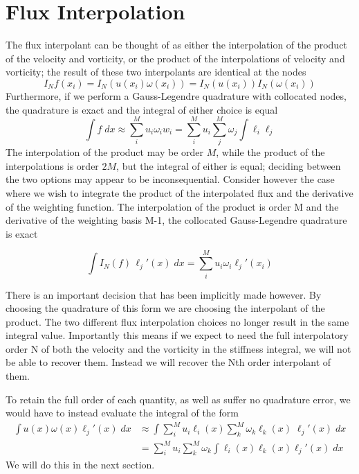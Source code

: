 \documentclass[letterpaper,12pt]{report}
\newcommand{\be}{\begin{equation}}
\newcommand{\ee}{\end{equation}}
\begin{document}
\section{Flux Interpolation}
The flux interpolant can be thought of  as either the interpolation of the product of the velocity and vorticity, or the product of the interpolations of velocity and vorticity; the result of these two interpolants are identical at the nodes
\be I_N f(x_i) = I_N(u(x_i) \omega(x_i)) = I_N(u(x_i)) I_N(\omega(x_i)) \ee
Furthermore, if we perform a Gauss-Legendre quadrature with collocated nodes, the quadrature is exact and the integral of either choice is equal
\be \int f \;dx \approx \sum_i^M u_i \omega_i w_i = \sum_i^M u_i \sum_j^M \omega_j \int \ell_i \ell_j \ee
The interpolation of the product may be order $M$, while the product of the interpolations is order $2M$, but the integral of either is equal; deciding between the two options may appear to be inconsequential. Consider however the case where we wish to integrate the product of the interpolated flux and the derivative of the weighting function. The interpolation of the product is order M and the derivative of the weighting basis M-1, the collocated Gauss-Legendre quadrature is exact

\be \int I_N(f) \, \ell_j'(x) \;dx = \sum_i^M u_i\omega_i \ell_j'(x_i) \ee

There is an important decision that has been implicitly made however. By choosing the quadrature of this form we are choosing the interpolant of the product. The two different flux interpolation choices no longer result in the same integral value. Importantly this means if we expect to need the full interpolatory order N of both the velocity and the vorticity in the stiffness integral, we will not be able to recover them. Instead we will recover the Nth order interpolant of them.

To retain the full order of each quantity, as well as suffer no quadrature error, we would have to instead evaluate the integral of the form
\be \begin{split}\int u(x) \omega(x) \ell_j'(x) \;dx &\approx \int \sum_i^M u_i \ell_i(x) \sum_k^M \omega_k \ell_k(x) \;\ell_j'(x) \;dx\\
&=\sum_i^M u_i \sum_k^M \omega_k \int \ell_i(x) \ell_k(x) \ell_j'(x) \;dx
\end{split}\ee
We will do this in the next section.
%
\end{document}

